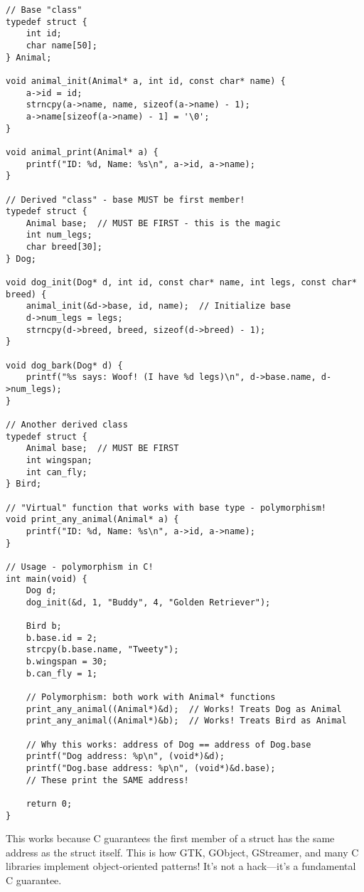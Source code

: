 \begin{lstlisting}
// Base "class"
typedef struct {
    int id;
    char name[50];
} Animal;

void animal_init(Animal* a, int id, const char* name) {
    a->id = id;
    strncpy(a->name, name, sizeof(a->name) - 1);
    a->name[sizeof(a->name) - 1] = '\0';
}

void animal_print(Animal* a) {
    printf("ID: %d, Name: %s\n", a->id, a->name);
}

// Derived "class" - base MUST be first member!
typedef struct {
    Animal base;  // MUST BE FIRST - this is the magic
    int num_legs;
    char breed[30];
} Dog;

void dog_init(Dog* d, int id, const char* name, int legs, const char* breed) {
    animal_init(&d->base, id, name);  // Initialize base
    d->num_legs = legs;
    strncpy(d->breed, breed, sizeof(d->breed) - 1);
}

void dog_bark(Dog* d) {
    printf("%s says: Woof! (I have %d legs)\n", d->base.name, d->num_legs);
}

// Another derived class
typedef struct {
    Animal base;  // MUST BE FIRST
    int wingspan;
    int can_fly;
} Bird;

// "Virtual" function that works with base type - polymorphism!
void print_any_animal(Animal* a) {
    printf("ID: %d, Name: %s\n", a->id, a->name);
}

// Usage - polymorphism in C!
int main(void) {
    Dog d;
    dog_init(&d, 1, "Buddy", 4, "Golden Retriever");

    Bird b;
    b.base.id = 2;
    strcpy(b.base.name, "Tweety");
    b.wingspan = 30;
    b.can_fly = 1;

    // Polymorphism: both work with Animal* functions
    print_any_animal((Animal*)&d);  // Works! Treats Dog as Animal
    print_any_animal((Animal*)&b);  // Works! Treats Bird as Animal

    // Why this works: address of Dog == address of Dog.base
    printf("Dog address: %p\n", (void*)&d);
    printf("Dog.base address: %p\n", (void*)&d.base);
    // These print the SAME address!

    return 0;
}
\end{lstlisting}

\begin{notebox}
This works because C guarantees the first member of a struct has the same address as the struct itself. This is how GTK, GObject, GStreamer, and many C libraries implement object-oriented patterns! It's not a hack---it's a fundamental C guarantee.
\end{notebox}

